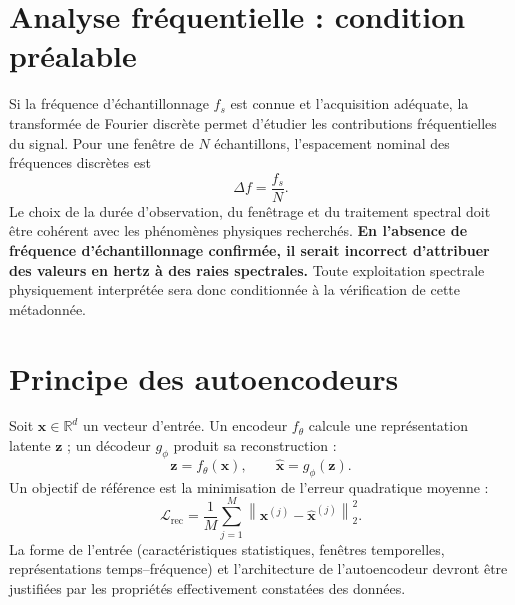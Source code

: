 \section{Analyse fréquentielle : condition préalable}
Si la fréquence d'échantillonnage $f_s$ est connue et l'acquisition adéquate, la transformée de Fourier discrète permet d'étudier les contributions fréquentielles du signal. Pour une fenêtre de $N$ échantillons, l'espacement nominal des fréquences discrètes est
\begin{equation}
  \Delta f=\frac{f_s}{N}.
  \label{eq:resolution}
\end{equation}
Le choix de la durée d'observation, du fenêtrage et du traitement spectral doit être cohérent avec les phénomènes physiques recherchés. \textbf{En l'absence de fréquence d'échantillonnage confirmée, il serait incorrect d'attribuer des valeurs en hertz à des raies spectrales.} Toute exploitation spectrale physiquement interprétée sera donc conditionnée à la vérification de cette métadonnée.

\section{Principe des autoencodeurs}
Soit $\mathbf{x}\in\mathbb{R}^d$ un vecteur d'entrée. Un encodeur $f_{\theta}$ calcule une représentation latente $\mathbf{z}$ ; un décodeur $g_{\phi}$ produit sa reconstruction :
\begin{equation}
  \mathbf{z}=f_{\theta}(\mathbf{x}),\qquad
  \widehat{\mathbf{x}}=g_{\phi}(\mathbf{z}).
\end{equation}
Un objectif de référence est la minimisation de l'erreur quadratique moyenne :
\begin{equation}
  \mathcal{L}_{\mathrm{rec}}=\frac{1}{M}\sum_{j=1}^{M}
    \left\|\mathbf{x}^{(j)}-\widehat{\mathbf{x}}^{(j)}\right\|_2^2.
  \label{eq:aeloss}
\end{equation}
La forme de l'entrée (caractéristiques statistiques, fenêtres temporelles, représentations temps--fréquence) et l'architecture de l'autoencodeur devront être justifiées par les propriétés effectivement constatées des données.

